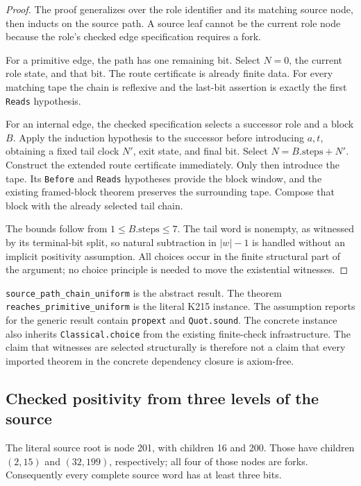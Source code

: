 \documentclass[11pt,letterpaper]{article}
\newcommand{\code}[1]{\texttt{\small #1}}
\begin{document}
\begin{proof}
The proof generalizes over the role identifier and its matching source node, then
inducts on the source path. A source leaf cannot be the current role node because
the role's checked edge specification requires a fork.

For a primitive edge, the path has one remaining bit. Select \(N=0\), the current
role state, and that bit. The route certificate is already finite data. For every
matching tape the chain is reflexive and the last-bit assertion is exactly the
first \code{Reads} hypothesis.

For an internal edge, the checked specification selects a successor role and a block
\(B\). Apply the induction hypothesis to the successor before introducing \(a,t\),
obtaining a fixed tail clock \(N'\), exit state, and final bit. Select
\(N=B.\mathrm{steps}+N'\). Construct the extended route certificate immediately.
Only then introduce the tape. Its \code{Before} and \code{Reads} hypotheses provide
the block window, and the existing framed-block theorem preserves the surrounding
tape. Compose that block with the already selected tail chain.

The bounds follow from \(1\le B.\mathrm{steps}\le7\). The tail word is nonempty,
as witnessed by its terminal-bit split, so natural subtraction in \(|w|-1\) is handled
without an implicit positivity assumption. All choices occur in the finite structural
part of the argument; no choice principle is needed to move the existential witnesses.
\end{proof}

\code{source\_path\_chain\_uniform} is the abstract result.
The theorem \code{reaches\_primitive\_uniform} is the literal K215 instance.
The assumption reports for the generic result
contain \code{propext} and \code{Quot.sound}. The concrete instance also inherits
\code{Classical.choice} from the existing finite-check infrastructure. The claim
that witnesses are selected structurally is therefore not a claim that every imported
theorem in the concrete dependency closure is axiom-free.

\subsection{Checked positivity from three levels of the source}

The literal source root is node 201, with children 16 and 200. Those have children
\((2,15)\) and \((32,199)\), respectively; all four of those nodes are forks.
Consequently every complete source word has at least three bits.
\end{document}
